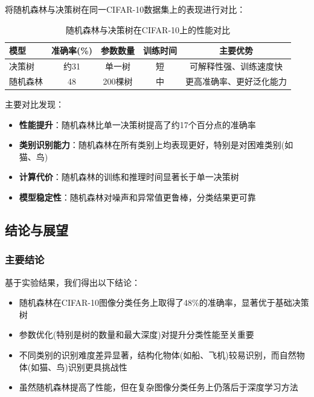 \documentclass[UTF8]{report}
\theoremstyle{MyLineTheoremStyle} %
\theoremstyle{MyBlockTheoremStyle} %
\theoremstyle{MySubsubsectionStyle} %
\begin{document}
将随机森林与决策树在同一CIFAR-10数据集上的表现进行对比：

\begin{table}[h]
\centering
\caption{随机森林与决策树在CIFAR-10上的性能对比}
\begin{tabular}{l c c c c}
\toprule
\textbf{模型} & \textbf{准确率(\%)} & \textbf{参数数量} & \textbf{训练时间} & \textbf{主要优势} \\
\midrule
决策树 & 约31 & 单一树 & 短 & 可解释性强、训练速度快 \\
随机森林 & 48 & 200棵树 & 中 & 更高准确率、更好泛化能力 \\
\bottomrule
\end{tabular}
\end{table}

主要对比发现：
\begin{itemize}
    \item \textbf{性能提升}：随机森林比单一决策树提高了约17个百分点的准确率
    \item \textbf{类别识别能力}：随机森林在所有类别上均表现更好，特别是对困难类别(如猫、鸟)
    \item \textbf{计算代价}：随机森林的训练和推理时间显著长于单一决策树
    \item \textbf{模型稳定性}：随机森林对噪声和异常值更鲁棒，分类结果更可靠
\end{itemize}

\subsection{结论与展望}

\subsubsection{主要结论}
基于实验结果，我们得出以下结论：
\begin{itemize}
    \item 随机森林在CIFAR-10图像分类任务上取得了48\%的准确率，显著优于基础决策树
    \item 参数优化(特别是树的数量和最大深度)对提升分类性能至关重要
    \item 不同类别的识别难度差异显著，结构化物体(如船、飞机)较易识别，而自然物体(如猫、鸟)识别更具挑战性
    \item 虽然随机森林提高了性能，但在复杂图像分类任务上仍落后于深度学习方法
\end{itemize}
\end{document}
